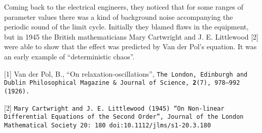   Coming back to the electrical engineers, they noticed that for some ranges of 
  parameter values there was a kind of background noise accompanying the 
  periodic sound of the limit cycle. Initially they blamed flaws in the 
  equipment, but in 1945 the British mathematicians Mary Cartwright and J. E. 
  Littlewood [2] were able to show that the effect was predicted by Van der 
  Pol's equation. It was an early example of ``deterministic chaos''. 

  \sectionreferences{}[1] Van der Pol, B., ``On relaxation-oscillations'', 
  \tt{}The London, Edinburgh and Dublin Philosophical Magazine \& Journal of 
  Science\rm{}, \textbf{2}(7), 978–992 (1926). 

  [2] \tt{}Mary Cartwright\rm{} and \tt{}J. E. Littlewood\rm{} (1945) ``On 
  Non-linear Differential Equations of the Second Order'', \tt{}Journal of the 
  London Mathematical Society\rm{} 20: 180 
  \tt{}doi\rm{}:\tt{}10.1112/jlms/s1-20.3.180\rm{} 